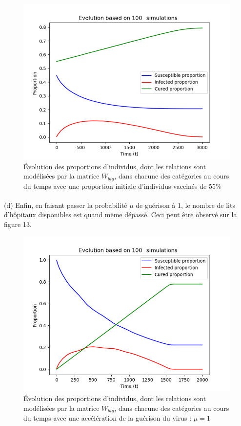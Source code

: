 \documentclass[a4paper, 12pt, oneside]{article}
\begin{document}
\begin{figure}[H]
	\centering
	\includegraphics[scale=1]{Wbig_dense_initial_immunised_comparaison.png} 
	\caption{Évolution des proportions d'individus, dont les relations sont modélisées par la matrice $W_{big}$, dans chacune des catégories au cours du temps avec une proportion initiale d'individus vaccinés de 55\%}
\end{figure}

\paragraph{}(d) Enfin, en faisant passer la probabilité $\mu$ de guérison à 1, le nombre de lits d'hôpitaux disponibles est quand même dépassé. Ceci peut être observé sur la figure 13.

\begin{figure}[H]
	\centering
	\includegraphics[scale=1]{Wbig_dense_speeded_heal_comparaison.png} 
	\caption{Évolution des proportions d'individus, dont les relations sont modélisées par la matrice $W_{big}$, dans chacune des catégories au cours du temps avec une accélération de la guérison du virus : $\mu = 1$}
\end{figure}
\end{document}
